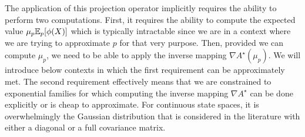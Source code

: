 The application of this projection operator implicitly requires the ability to perform two computations. First, it requires the ability to compute the expected value $\mu_p\mathbb E_{p}[\phi(X)]$ which is typically intractable since we are in a context where we are trying to approximate $p$ for that very purpose. Then, provided we can compute $\mu_p$, we need to be able to apply the inverse mapping $\nabla A^{\star}(\mu_p)$. We will introduce below contexts in which the first requirement can be approximately met. The second requirement effectively means that we are constrained to exponential families for which computing the inverse mapping $\nabla A^{\star}$ can be done explicitly or is cheap to approximate. For continuous state spaces, it is overwhelmingly the Gaussian distribution that is considered in the literature with either a diagonal or a full covariance matrix. 
%

